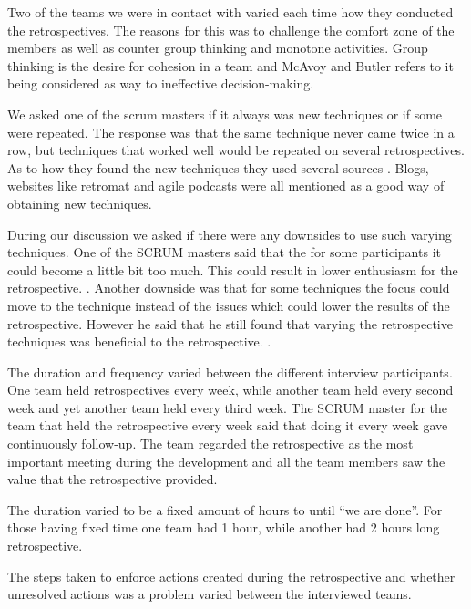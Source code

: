 Two of the teams we were in contact with varied each time how they conducted the retrospectives. The reasons for this was to challenge the comfort zone of the members as well as counter group thinking and monotone activities. Group thinking is the desire for cohesion in a team and McAvoy and Butler \cite{Mcavoy2007} refers to it being considered as way to ineffective decision-making. 

We asked one of the scrum masters if it always was new techniques or if some were repeated. The response was that the same technique never came twice in a row, but techniques that worked well would be repeated on several retrospectives. As to how they found the new techniques they used several sources . Blogs, websites like retromat \cite{Retromat2015} and agile podcasts were all mentioned as a good way of obtaining new techniques. 

During our discussion we asked if there were any downsides to use such varying techniques. One of the SCRUM masters said that the for some participants it could become a little bit too much. This could result in lower enthusiasm for the retrospective. . Another downside was that for some techniques the focus could move to the technique instead of the issues which could lower the results of the retrospective. However he said that he still found that varying the retrospective techniques was beneficial to the retrospective. .

\label{question-3a}
The duration and frequency varied between the different interview participants. One team held retrospectives every week, while another team held every second week and yet another team held every third week. The SCRUM master for the team that held the retrospective every week said that doing it every week gave continuously follow-up. The team regarded the retrospective as the most important meeting during the development and all the team members saw the value that the retrospective provided. 

\label{question-3b}
The duration varied to be a fixed amount of hours to until ``we are done''. For those having fixed time one team had 1 hour, while another had 2 hours long retrospective. 

\label{question-8}

\label{question-6}
The steps taken to enforce actions created during the retrospective and whether unresolved actions was a problem varied between the interviewed teams. 

